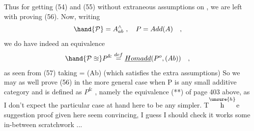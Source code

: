 Thus for getting (54) and (55) without extraneous assumptions on ,
we are left with proving (56). Now, writing
\[ \hand{\mathcal{P}}= A^{\wedge}_{ab}\ ,\quad P = Add(A)\quad , \]
we do have indeed an equivalence
\[ \hand{\mathcal{P}\approxeq} P^{\&} \overset{def}{=} \underline{Homadd}(P^o,(Ab))\quad , \]
as seen from (57) taking = (Ab) (which satisfies the extra assumptions)
So we may as well prove (56) in the more general case when P is any small
additive category and  is defined as $P^{\&}$ , namely  the equivalence (**)
of page 403 above, as I don't expect the particular case at hand here to
be any simpler. T\(\overset{\unsure{h}}{\text{h}}\)e suggestion  proof given here seem convincing, I
guess I should check it works   some in-between scratchwork ...

